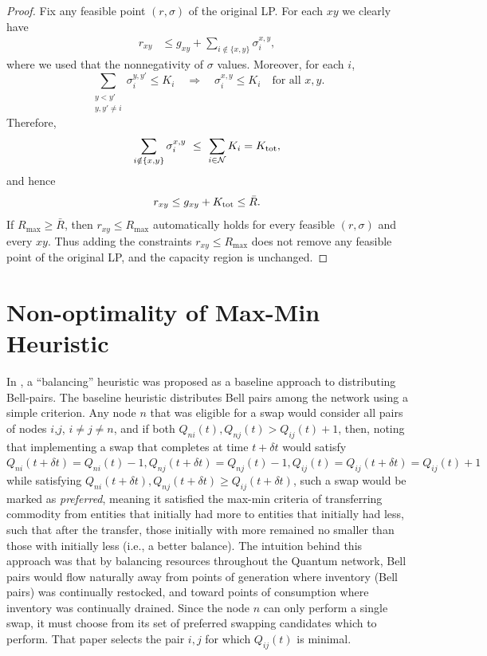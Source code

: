 \documentclass[11pt]{article}
\newcommand{\Ncal}{\mathcal{N}}
\begin{document}
\begin{proof}
Fix any feasible point $(r,\sigma)$ of the original LP. For each $xy$ we clearly have 
\begin{align*}
r_{xy}
&\le g_{xy}
+ \sum_{i\notin\{x,y\}}\sigma_i^{x,y},
\end{align*}
where we used that the nonnegativity of $\sigma$ values. Moreover, for each $i$,
\[
\sum_{\substack{y<y'\\ y,y'\neq i}}\sigma_i^{y,y'} \le K_i
\quad\Rightarrow\quad
\sigma_i^{x,y} \le K_i
\quad\text{for all }x,y.
\]
Therefore,
\[
\sum_{i\notin\{x,y\}}\sigma_i^{x,y}
\ \le\ \sum_{i\in\Ncal} K_i
= K_{\rm tot},
\]
and hence
\[
r_{xy} \le g_{xy} + K_{\rm tot} \le \bar R.
\]
If $R_{\max} \ge \bar R$, then $r_{xy} \le R_{\max}$ automatically holds for every feasible $(r,\sigma)$ and every $xy$. Thus adding the constraints $r_{xy}\le R_{\max}$ does not remove any feasible point of the original LP, and the capacity region is unchanged.
\end{proof}



\section{Non-optimality of Max-Min Heuristic}

In \cite{mutolo2025path}, a ``balancing'' heuristic was proposed as a baseline approach to distributing Bell-pairs.  The baseline heuristic distributes Bell pairs among the network using a simple criterion.  Any node $n$ that was eligible for a swap would consider all pairs of nodes $i$,$j$, $i \ne j \ne n$, and if both $Q_{ni}(t), Q_{nj}(t) > Q_{ij}(t) + 1$, then, noting that implementing a swap that completes at time $t + \delta t$ would satisfy $Q_{ni}(t+\delta t) = Q_{ni}(t)-1, Q_{nj}(t+\delta t) = Q_{nj}(t)-1, Q_{ij}(t) = Q_{ij}(t+\delta t) = Q_{ij}(t) + 1$ while satisfying $Q_{ni}(t+\delta t), Q_{nj}(t+ \delta t) \ge Q_{ij}(t + \delta t)$, such a swap would be marked as {\em preferred}, meaning it satisfied the max-min criteria of transferring commodity from entities that initially had more to entities that initially had less, such that after the transfer, those initially with more remained no smaller than those with initially less (i.e., a better balance).  The intuition behind this approach was that by balancing resources throughout the Quantum network, Bell pairs would flow naturally away from points of generation where inventory (Bell pairs) was continually restocked, and toward points of consumption where inventory was continually drained.  Since the node $n$ can only perform a single swap, it must choose from its set of preferred swapping candidates which to perform.  That paper selects the pair $i,j$ for which $Q_{ij}(t)$ is minimal.
\end{document}

